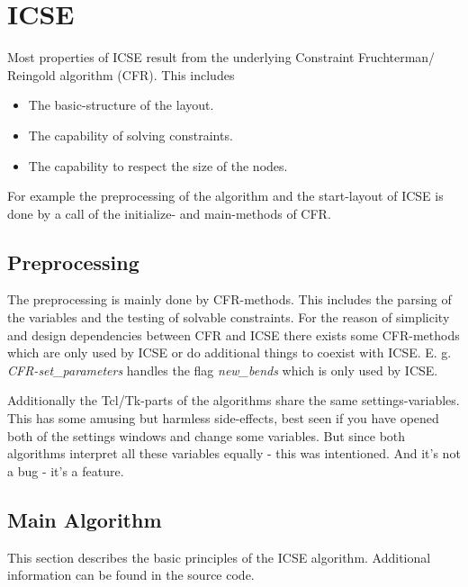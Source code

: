 \documentclass[notitlepage,fleqn]{article}
\begin{document}
\section{ICSE}

Most properties of ICSE 
result from the underlying Constraint Fruchterman/
Reingold algorithm (CFR). This includes
\begin{itemize}
\item The basic-structure of the layout.
\item The capability of solving constraints.
\item The capability to respect the size of the nodes.
\end{itemize}
For example the preprocessing of the algorithm and the start-layout
of ICSE is done by a call of the initialize- and main-methods
of CFR.

\subsection{Preprocessing}
The preprocessing is mainly done by CFR-methods. This includes
the parsing of the variables and the testing of solvable constraints.
For the reason of simplicity and design dependencies between CFR and
ICSE there exists some CFR-methods which are only used by ICSE or
do additional things to coexist with ICSE. E. g. {\em CFR-set\_parameters}
handles the flag {\em new\_bends} which is only used by ICSE.

Additionally the Tcl/Tk-parts of the algorithms share the same
settings-variables. This has some amusing but harmless
side-effects, best seen if you have opened both of the settings
windows and change some variables. But since both algorithms interpret
all these variables equally - this was intentioned. And it's not
a bug - it's a feature.

\subsection{Main Algorithm}

This section describes the basic principles of the ICSE
algorithm. Additional information can be found in the source code.
\end{document}
